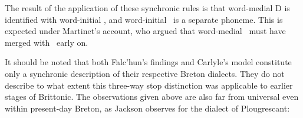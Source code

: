 The result of the application of these synchronic rules is that word-medial \gls{D} is identified with word-initial \lT, and word-initial \xD\ is a separate phoneme. This is expected under Martinet's account, who argued that word-medial \xD\ must have merged with \lT\ early on.

It should be noted that both Falc'hun's findings and Carlyle's model constitute only a synchronic description of their respective Breton dialects. They do not describe to what extent this three-way stop distinction was applicable to earlier stages of Brittonic. The observations given above are also far from universal even within present-day Breton, as Jackson observes for the dialect of Plougrescant:




